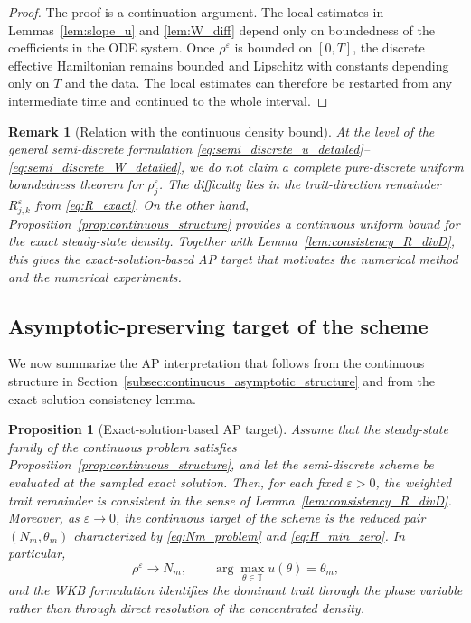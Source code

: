 \documentclass[11pt, dina4, amsfont12]{article}
\newtheorem{proposition}{Proposition}[section]
\newtheorem{remark}{Remark}[section]
\begin{document}
\begin{proof}
The proof is a continuation argument. The local estimates in Lemmas~\ref{lem:slope_u} and \ref{lem:W_diff} depend only on boundedness of the coefficients in the ODE system. Once \(\rho^\varepsilon\) is bounded on \([0,T]\), the discrete effective Hamiltonian remains bounded and Lipschitz with constants depending only on \(T\) and the data. The local estimates can therefore be restarted from any intermediate time and continued to the whole interval.
\end{proof}

\begin{remark}[Relation with the continuous density bound]\label{rem:rho_status}
At the level of the general semi-discrete formulation \eqref{eq:semi_discrete_u_detailed}--\eqref{eq:semi_discrete_W_detailed}, we do not claim a complete pure-discrete uniform boundedness theorem for \(\rho_j^\varepsilon\). The difficulty lies in the trait-direction remainder \(R_{j,k}^\varepsilon\) from \eqref{eq:R_exact}. On the other hand, Proposition~\ref{prop:continuous_structure} provides a continuous uniform bound for the exact steady-state density. Together with Lemma~\ref{lem:consistency_R_divD}, this gives the exact-solution-based AP target that motivates the numerical method and the numerical experiments.
\end{remark}

\subsection{Asymptotic-preserving target of the scheme}

We now summarize the AP interpretation that follows from the continuous structure in Section~\ref{subsec:continuous_asymptotic_structure} and from the exact-solution consistency lemma.

\begin{proposition}[Exact-solution-based AP target]\label{prop:AP_target}
Assume that the steady-state family of the continuous problem satisfies Proposition~\ref{prop:continuous_structure}, and let the semi-discrete scheme be evaluated at the sampled exact solution. Then, for each fixed \(\varepsilon>0\), the weighted trait remainder is consistent in the sense of Lemma~\ref{lem:consistency_R_divD}. Moreover, as \(\varepsilon\to0\), the continuous target of the scheme is the reduced pair \((N_m,\theta_m)\) characterized by \eqref{eq:Nm_problem} and \eqref{eq:H_min_zero}. In particular,
\begin{equation}\label{eq:AP_target_statement}
\rho^\varepsilon \to N_m,
\qquad
\arg\max_{\theta\in\mathbb T} u(\theta)=\theta_m,
\end{equation}
and the WKB formulation identifies the dominant trait through the phase variable rather than through direct resolution of the concentrated density.
\end{proposition}
\end{document}
